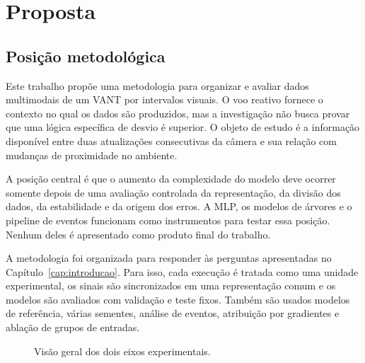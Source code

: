 \chapter{Proposta}\label{cap:proposta}

\section{Posição metodológica}

Este trabalho propõe uma metodologia para organizar e avaliar dados multimodais de um VANT por intervalos visuais. O voo reativo fornece o contexto no qual os dados são produzidos, mas a investigação não busca provar que uma lógica específica de desvio é superior. O objeto de estudo é a informação disponível entre duas atualizações consecutivas da câmera e sua relação com mudanças de proximidade no ambiente.

A posição central é que o aumento da complexidade do modelo deve ocorrer somente depois de uma avaliação controlada da representação, da divisão dos dados, da estabilidade e da origem dos erros. A MLP, os modelos de árvores e o pipeline de eventos funcionam como instrumentos para testar essa posição. Nenhum deles é apresentado como produto final do trabalho.

A metodologia foi organizada para responder às perguntas apresentadas no Capítulo~\ref{cap:introducao}. Para isso, cada execução é tratada como uma unidade experimental, os sinais são sincronizados em uma representação comum e os modelos são avaliados com validação e teste fixos. Também são usados modelos de referência, várias sementes, análise de eventos, atribuição por gradientes e ablação de grupos de entradas.

\begin{figure}[htb]
\centering
{}
\caption{Visão geral dos dois eixos experimentais.}
\label{fig:fluxo-dois-eixos}
\end{figure}

